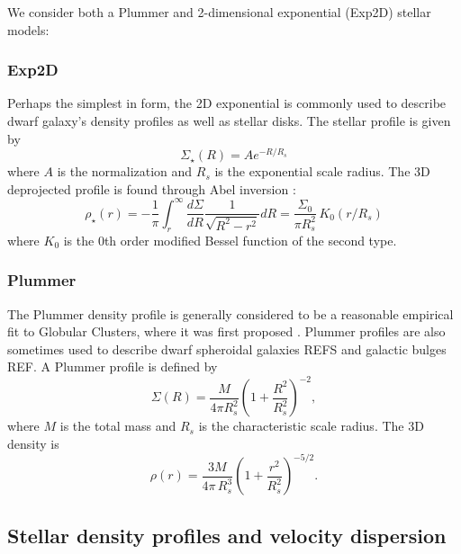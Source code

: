 We consider both a Plummer and 2-dimensional exponential (Exp2D) stellar
models:

\subsubsection{Exp2D}\label{exp2d}

Perhaps the simplest in form, the 2D exponential is commonly used to
describe dwarf galaxy's density profiles as well as stellar disks. The
stellar profile is given by \begin{equation}{
\Sigma_\star(R) = A e^{-R / R_s}
}\end{equation} where \(A\) is the normalization and \(R_s\) is the
exponential scale radius. The 3D deprojected profile is found through
Abel inversion \citep[e.g.][]{errani+2024}: \begin{equation}{
\rho_\star (r) =- \frac{1}{\pi}\int_r^\infty \frac{d\Sigma}{dR} \frac{1}{\sqrt{R^2 - r^2}} dR  = \frac{\Sigma_0}{\pi R_s^2}\,K_0(r/R_s)
}\end{equation} where \(K_0\) is the 0th order modified Bessel function
of the second type.

\subsubsection{Plummer}\label{plummer}

The Plummer density profile is generally considered to be a reasonable
empirical fit to Globular Clusters, where it was first proposed
\citep{sadfjk}. Plummer profiles are also sometimes used to describe
dwarf spheroidal galaxies REFS and galactic bulges REF. A Plummer
profile is defined by \begin{equation}{
\Sigma(R) = \frac{M}{4\pi R_s^2} \left(1 + \frac{R^2}{R_s^2}\right)^{-2} ,
}\end{equation} where \(M\) is the total mass and \(R_s\) is the
characteristic scale radius. The 3D density is \begin{equation}{
\rho(r) = \frac{3M}{4\pi\,R_s^3} \left(1 + \frac{r^2}{R_s^2}\right)^{-5/2}.
}\end{equation}

\subsection{Stellar density profiles and velocity
dispersion}\label{stellar-density-profiles-and-velocity-dispersion}


